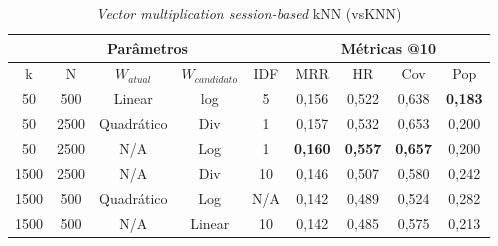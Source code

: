 
\begin{table}[htbp]
\centering
  \begin{tabular}{|c|c|c|c|c|c|c|c|c|}
    \hline
    \multicolumn{5}{|c|}{Parâmetros} & \multicolumn{4}{c|}{Métricas @10} \\
    \hline
    k & N & $W_{atual}$ & $W_{candidato}$ & IDF & MRR & HR & Cov & Pop \\
    \hline
    50 & 500 & Linear & log & 5 & 0,156 & 0,522  & 0,638 & \textbf{0,183} \\
    \hline
    50 & 2500 & Quadrático & Div & 1 & 0,157 & 0,532 & 0,653 & 0,200 \\
    \hline
    50 & 2500 & N/A & Log & 1 & \textbf{0,160} & \textbf{0,557} & \textbf{0,657} & 0,200 \\
    \hline
    1500 & 2500 & N/A & Div & 10 & 0,146 & 0,507 & 0,580 & 0,242 \\
    \hline
    1500 & 500 & Quadrático & Log & N/A & 0,142 & 0,489 & 0,524 & 0,282 \\
    \hline
    1500 & 500 & N/A & Linear & 10 & 0,142 & 0,485 & 0,575 & 0,213 \\
    \hline
  \end{tabular}
  \caption{\textit{Vector multiplication session-based} kNN (vsKNN)}
\end{table}

